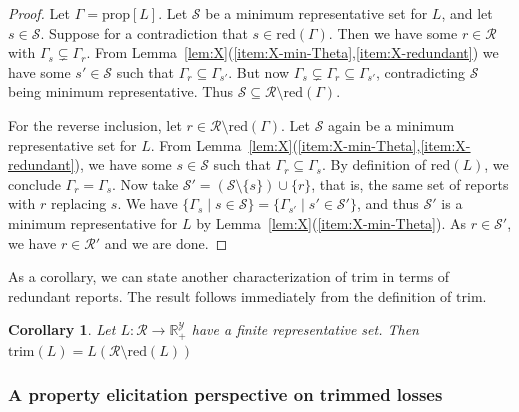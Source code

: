 \documentclass[11pt]{article}
\newcommand{\reals}{\mathbb{R}}
\newcommand{\prop}[1]{\mathrm{prop}[#1]}
\newcommand{\R}{\mathcal{R}}
\newcommand{\Sc}{\mathcal{S}}
\newcommand{\Y}{\mathcal{Y}}
\newcommand{\trim}{\mathrm{trim}}
\newcommand{\red}{\mathrm{red}}
\newcommand{\trimcover}{\mathrm{trim}}
\newtheorem{corollary}{Corollary}
\begin{document}
\begin{proof}
  Let $\Gamma = \prop L$.
  Let $\Sc$ be a minimum representative set for $L$, and let $s\in\Sc$.
  Suppose for a contradiction that $s\in\red(\Gamma)$.
  Then we have some $r\in\R$ with $\Gamma_s \subsetneq \Gamma_r$.
  From Lemma~\ref{lem:X}(\ref{item:X-min-Theta},\ref{item:X-redundant}) we have some $s'\in\Sc$ such that $\Gamma_r \subseteq \Gamma_{s'}$.
  But now $\Gamma_s \subsetneq \Gamma_r \subseteq \Gamma_{s'}$, contradicting $\Sc$ being minimum representative.
  Thus $\Sc \subseteq \R \setminus \red(\Gamma)$.

  For the reverse inclusion, let $r\in\R\setminus\red(\Gamma)$.
  Let $\Sc$ again be a minimum representative set for $L$.
  From Lemma~\ref{lem:X}(\ref{item:X-min-Theta},\ref{item:X-redundant}), we have some $s\in\Sc$ such that $\Gamma_r \subseteq \Gamma_s$.
  By definition of $\red(L)$, we conclude $\Gamma_r = \Gamma_s$.
  Now take $\Sc' = (\Sc \setminus \{s\}) \cup \{r\}$, that is, the same set of reports with $r$ replacing $s$.
  We have $\{\Gamma_s \mid s\in\Sc\} = \{\Gamma_{s'} \mid s'\in\Sc'\}$, and thus $\Sc'$ is a minimum representative for $L$ by Lemma~\ref{lem:X}(\ref{item:X-min-Theta}).
  As $r\in\Sc'$, we have $r \in \R'$ and we are done.
\end{proof}


As a corollary, we can state another characterization of $\trim$ in terms of redundant reports.
The result follows immediately from the definition of $\trim$.

\begin{corollary}\label{cor:trim-loss-red}
  Let $L : \R \to \reals^\Y_+$ have a finite representative set.
  Then $\trimcover(L) = L(\R \setminus \red(L))$
\end{corollary}



\subsubsection{A property elicitation perspective on trimmed losses}
\end{document}
